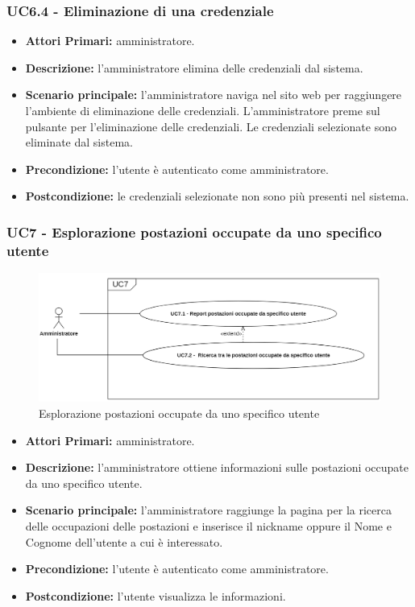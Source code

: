 \subsubsection{ UC6.4 - Eliminazione di una credenziale}
\begin{itemize}
	\item\textbf{Attori Primari:} 
	amministratore.
	\item\textbf{Descrizione:} 
	l'amministratore elimina delle credenziali dal sistema.
	\item\textbf{Scenario principale:} 
	l'amministratore naviga nel sito web per raggiungere l'ambiente di eliminazione delle credenziali.
	L'amministratore preme sul pulsante per l'eliminazione delle credenziali.
	Le credenziali selezionate sono eliminate dal sistema.
	\item\textbf{Precondizione:} 
	l'utente è autenticato come amministratore.
	\item\textbf{Postcondizione:}
	le credenziali selezionate non sono più presenti nel sistema.
\end{itemize}

\subsubsection{ UC7 - Esplorazione postazioni occupate da uno specifico utente}
\begin{figure}[H]
	\centering
	\includegraphics[width=15cm]{res/images/UC7.png}
	\caption{Esplorazione postazioni occupate da uno specifico utente}
	\label{fig:Esplorazione postazioni occupate da uno specifico utente}
\end{figure}
\begin{itemize}
	\item\textbf{Attori Primari:} 
	amministratore.
	\item\textbf{Descrizione:} 
	l'amministratore ottiene informazioni sulle postazioni occupate da uno specifico utente.
	\item\textbf{Scenario principale:} 
	l'amministratore raggiunge la pagina per la ricerca delle occupazioni delle postazioni e inserisce il nickname oppure il Nome e Cognome dell'utente a cui è interessato.
	\item\textbf{Precondizione:} 
	l'utente è autenticato come amministratore.
	\item\textbf{Postcondizione:}
	l'utente visualizza le informazioni.
\end{itemize}

